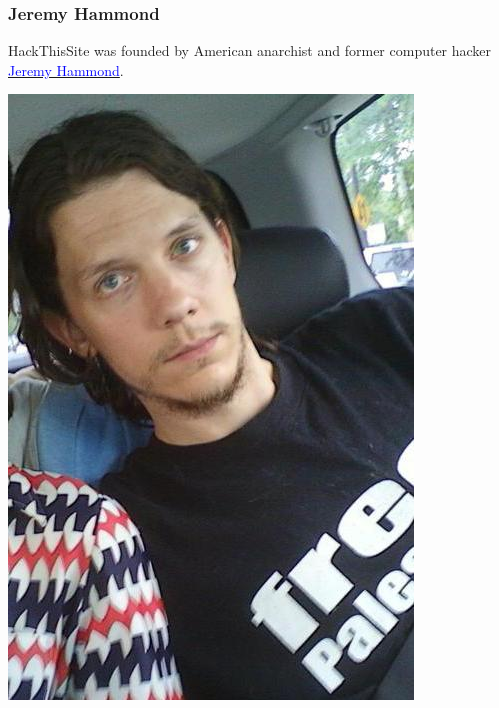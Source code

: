 \documentclass[aspectratio=169,usenames,dvipsnames]{beamer}
\begin{document}
\begin{frame}
  \frametitle{Jeremy Hammond}

  HackThisSite was founded by American anarchist and former computer hacker
  \href{https://en.wikipedia.org/wiki/Jeremy_Hammond}{\textcolor{blue}{Jeremy
  Hammond}}.

  \centering

  \includegraphics[width=\textwidth,height=0.7\textheight,keepaspectratio]{img/jeremy_hammond.jpg}

\end{frame}
\end{document}
